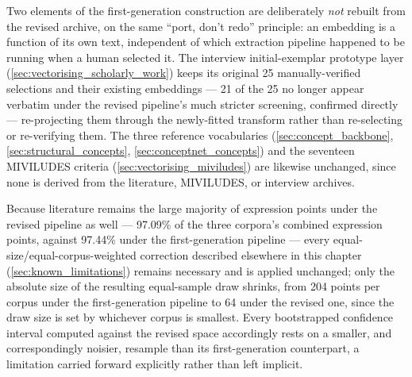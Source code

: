 Two elements of the first-generation construction are deliberately \emph{not} rebuilt from the revised archive, on the same \enquote{port, don't redo} principle: an embedding is a function of its own text, independent of which extraction pipeline happened to be running when a human selected it. The interview initial-exemplar prototype layer (\ref{sec:vectorising_scholarly_work}) keeps its original 25 manually-verified selections and their existing embeddings — 21 of the 25 no longer appear verbatim under the revised pipeline's much stricter screening, confirmed directly — re-projecting them through the newly-fitted transform rather than re-selecting or re-verifying them. The three reference vocabularies (\ref{sec:concept_backbone}, \ref{sec:structural_concepts}, \ref{sec:conceptnet_concepts}) and the seventeen MIVILUDES criteria (\ref{sec:vectorising_miviludes}) are likewise unchanged, since none is derived from the literature, MIVILUDES, or interview archives.

Because literature remains the large majority of expression points under the revised pipeline as well — 97.09\% of the three corpora's combined expression points, against 97.44\% under the first-generation pipeline — every equal-size/equal-corpus-weighted correction described elsewhere in this chapter (\ref{sec:known_limitations}) remains necessary and is applied unchanged; only the absolute size of the resulting equal-sample draw shrinks, from 204 points per corpus under the first-generation pipeline to 64 under the revised one, since the draw size is set by whichever corpus is smallest. Every bootstrapped confidence interval computed against the revised space accordingly rests on a smaller, and correspondingly noisier, resample than its first-generation counterpart, a limitation carried forward explicitly rather than left implicit.


